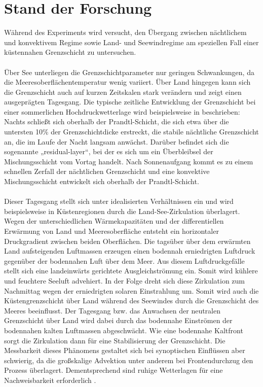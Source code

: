 \documentclass[a4paper,11pt,DIV=calc,tablecaptionabove,headinclude,twoside]{article}
\begin{document}
\section{Stand der Forschung}
Während des Experiments wird versucht, den Übergang zwischen nächtlichem und konvektivem Regime sowie Land- und Seewindregime am speziellen Fall einer küstennahen Grenzschicht zu untersuchen. \\\\
Über See unterliegen die Grenzschichtparameter nur geringen Schwankungen, da die Meeresoberflächentemperatur wenig variiert. Über Land hingegen kann sich die Grenzschicht auch auf kurzen Zeitskalen stark verändern und zeigt einen ausgeprägten Tagesgang. Die typische zeitliche Entwicklung der Grenzschicht bei einer sommerlichen Hochdruckwetterlage wird beispielsweise in \cite{stull1988introduction} beschrieben: Nachts schließt sich oberhalb der Prandtl-Schicht, die sich etwa über die untersten 10\% der Grenzschichtdicke erstreckt, die stabile nächtliche Grenzschicht an, die im Laufe der Nacht langsam anwächst. Darüber befindet sich die sogenannte „residual-layer“, bei der es sich um ein Überbleibsel der Mischungsschicht vom Vortag handelt. Nach Sonnenaufgang kommt es zu einem schnellen Zerfall der nächtlichen Grenzschicht und eine konvektive Mischungsschicht entwickelt sich oberhalb der Prandtl-Schicht. \\\\
Dieser Tagesgang stellt sich unter idealisierten Verhältnissen ein und wird beispielsweise in Küstenregionen durch die Land-See-Zirkulation überlagert. Wegen der unterschiedlichen Wärmekapazitäten und der differentiellen Erwärmung von Land und Meeresoberfläche entsteht ein horizontaler Druckgradient zwischen beiden Oberflächen. Die tagsüber über dem erwärmten Land aufsteigenden Luftmassen erzeugen einen bodennah erniedrigten Luftdruck gegenüber der bodennahen Luft über dem Meer.  
Aus diesem Luftdruckgefälle stellt sich eine landeinwärts gerichtete Ausgleichströmung ein. Somit wird kühlere und feuchtere Seeluft advehiert. In der Folge dreht sich diese Zirkulation zum Nachmittag wegen der erniedrigten solaren Einstrahlung um. Somit wird auch die Küstengrenzschicht über Land während des Seewindes durch die Grenzschicht des Meeres beeinflusst. Der Tagesgang bzw. das Anwachsen der neutralen Grenzschicht über Land wird dabei durch das bodennahe Einströmen der bodennahen kalten Luftmassen abgeschwächt. Wie eine bodennahe Kaltfront sorgt die Zirkulation dann für eine Stabilisierung der Grenzschicht. Die Messbarkeit dieses Phänomens gestaltet sich bei synoptischen Einflüssen aber schwierig, da die großskalige Advektion unter anderem bei Frontendurchzug den Prozess überlagert. Dementsprechend sind ruhige Wetterlagen für eine Nachweisbarkeit erforderlich \citep{Lange2004}.\\\\
\end{document}
